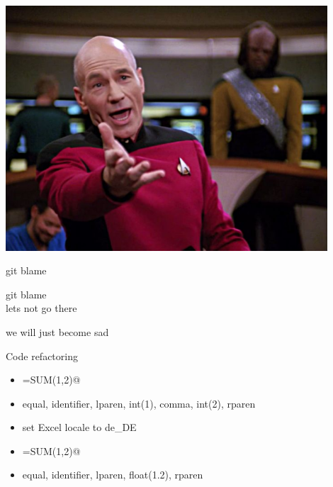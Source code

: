 \documentclass[aspectratio=169,notes]{beamer}
\begin{document}
	\begin{frame}[fragile]{\mbox{}}
		\begin{center}
		\vspace{-10mm}\includegraphics[width=0.9\textwidth]{picard.png}
		\end{center}
	\end{frame}

	\begin{frame}[fragile]{git blame}
		\begin{center}
			\Large
			git blame\\[2cm]
			\pause
			\Huge
			lets not go there\\[3cm]
		\end{center}
		{\scriptsize we will just become sad}
	\end{frame}

	\begin{frame}[fragile]{Code refactoring}
		\Large
		\begin{itemize}
			\item \lstinline@=SUM(1,2)@ \pause
			\item equal, identifier, lparen, int(1), comma, int(2), rparen\\[10mm] \pause
			\item set Excel locale to de\_DE \pause
			\item \lstinline@=SUM(1,2)@ \pause
			\item equal, identifier, lparen, float(1.2), rparen
		\end{itemize}
	\end{frame}

\end{document}
